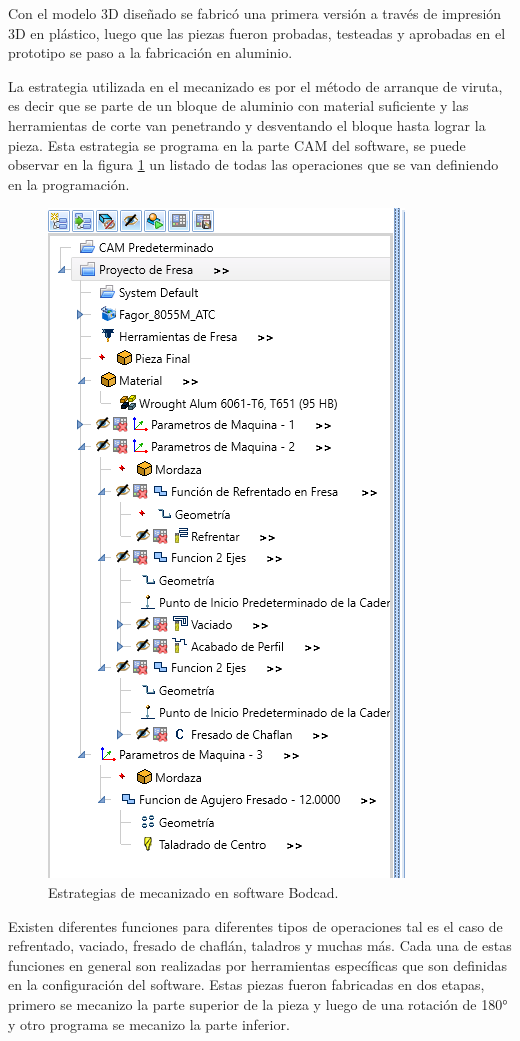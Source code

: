 Con el modelo 3D diseñado se fabricó una primera versión a través de impresión 3D en plástico, luego que las piezas fueron probadas, testeadas y aprobadas en el prototipo se paso a la fabricación en aluminio.

La estrategia utilizada en el mecanizado es por el método de arranque de viruta, es decir que se parte de un bloque de aluminio con material suficiente y las herramientas de corte van penetrando y desventando el bloque hasta lograr la pieza. Esta estrategia se programa en la parte CAM del software, se puede observar en la figura \ref{fig:estrategia} un listado de todas las operaciones que se van definiendo en la programación.

\begin{figure}[ht]
	\centering
	\includegraphics[width=.6\textwidth]{./Figures/3d_estrategia.png}
	\caption{Estrategias de mecanizado en software Bodcad.}
	\label{fig:estrategia}
\end{figure}

Existen diferentes funciones para diferentes tipos de operaciones tal es el caso de refrentado, vaciado, fresado de chaflán, taladros y muchas más. Cada una de estas funciones en general son realizadas por herramientas específicas que son definidas en la configuración del software.
Estas piezas fueron fabricadas en dos etapas, primero se mecanizo la parte superior de la pieza y luego de una rotación de  180° y otro programa se mecanizo la parte inferior.



